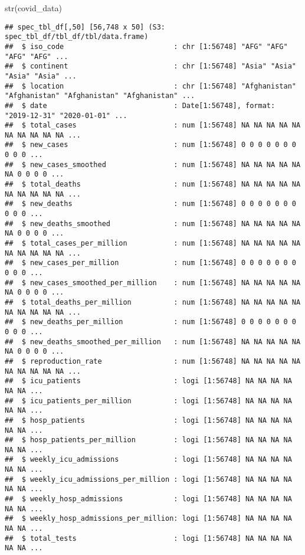 \documentclass[
]{article}
\newenvironment{Shaded}{\begin{snugshade}}{\end{snugshade}}
\newcommand{\FunctionTok}[1]{\textcolor[rgb]{0.00,0.00,0.00}{#1}}
\newcommand{\NormalTok}[1]{#1}
\begin{document}
\begin{Shaded}
\begin{Highlighting}[]
\FunctionTok{str}\NormalTok{(covid\_data)}
\end{Highlighting}
\end{Shaded}

\begin{verbatim}
## spec_tbl_df[,50] [56,748 x 50] (S3: spec_tbl_df/tbl_df/tbl/data.frame)
##  $ iso_code                          : chr [1:56748] "AFG" "AFG" "AFG" "AFG" ...
##  $ continent                         : chr [1:56748] "Asia" "Asia" "Asia" "Asia" ...
##  $ location                          : chr [1:56748] "Afghanistan" "Afghanistan" "Afghanistan" "Afghanistan" ...
##  $ date                              : Date[1:56748], format: "2019-12-31" "2020-01-01" ...
##  $ total_cases                       : num [1:56748] NA NA NA NA NA NA NA NA NA NA ...
##  $ new_cases                         : num [1:56748] 0 0 0 0 0 0 0 0 0 0 ...
##  $ new_cases_smoothed                : num [1:56748] NA NA NA NA NA NA 0 0 0 0 ...
##  $ total_deaths                      : num [1:56748] NA NA NA NA NA NA NA NA NA NA ...
##  $ new_deaths                        : num [1:56748] 0 0 0 0 0 0 0 0 0 0 ...
##  $ new_deaths_smoothed               : num [1:56748] NA NA NA NA NA NA 0 0 0 0 ...
##  $ total_cases_per_million           : num [1:56748] NA NA NA NA NA NA NA NA NA NA ...
##  $ new_cases_per_million             : num [1:56748] 0 0 0 0 0 0 0 0 0 0 ...
##  $ new_cases_smoothed_per_million    : num [1:56748] NA NA NA NA NA NA 0 0 0 0 ...
##  $ total_deaths_per_million          : num [1:56748] NA NA NA NA NA NA NA NA NA NA ...
##  $ new_deaths_per_million            : num [1:56748] 0 0 0 0 0 0 0 0 0 0 ...
##  $ new_deaths_smoothed_per_million   : num [1:56748] NA NA NA NA NA NA 0 0 0 0 ...
##  $ reproduction_rate                 : num [1:56748] NA NA NA NA NA NA NA NA NA NA ...
##  $ icu_patients                      : logi [1:56748] NA NA NA NA NA NA ...
##  $ icu_patients_per_million          : logi [1:56748] NA NA NA NA NA NA ...
##  $ hosp_patients                     : logi [1:56748] NA NA NA NA NA NA ...
##  $ hosp_patients_per_million         : logi [1:56748] NA NA NA NA NA NA ...
##  $ weekly_icu_admissions             : logi [1:56748] NA NA NA NA NA NA ...
##  $ weekly_icu_admissions_per_million : logi [1:56748] NA NA NA NA NA NA ...
##  $ weekly_hosp_admissions            : logi [1:56748] NA NA NA NA NA NA ...
##  $ weekly_hosp_admissions_per_million: logi [1:56748] NA NA NA NA NA NA ...
##  $ total_tests                       : logi [1:56748] NA NA NA NA NA NA ...

\end{verbatim}
\end{document}
